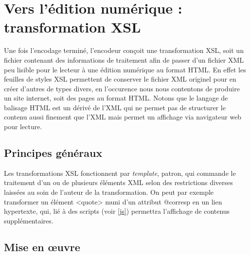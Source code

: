 \documentclass[12pt, a4paper]{article}
\begin{document}
\section{Vers l'édition numérique : transformation XSL}
\label{ref:xsl_gen}
Une fois l'encodage terminé, l'encodeur conçoit une transformation XSL, soit un fichier contenant des informations de traitement afin de passer d'un fichier XML peu lisible pour le lecteur à une édition numérique au format HTML. En effet les feuilles de styles XSL permettent de conserver le fichier XML originel pour en créer d'autres de types divers, en l'occurence nous nous contentons de produire un site internet, soit des pages au format HTML. Notons que le langage de balisage HTML est un dérivé de l'XML qui ne permet pas de structurer le contenu aussi finement que l'XML mais permet un affichage via navigateur web pour lecture.
    \subsection{Principes généraux}
Les transformations XSL fonctionnent par \textit{template}, patron, qui commande le traitement d'un ou de plusieurs éléments XML selon des restrictions diverses laissées au soin de l'auteur de la transformation. On peut par exemple transformer un élément <quote> muni d'un attribut @corresp en un lien hypertexte, qui, lié à des scripts (voir \ref{js}) permettra l'affichage de contenus supplémentaires. 
    \subsection{Mise en œuvre}
\end{document}
